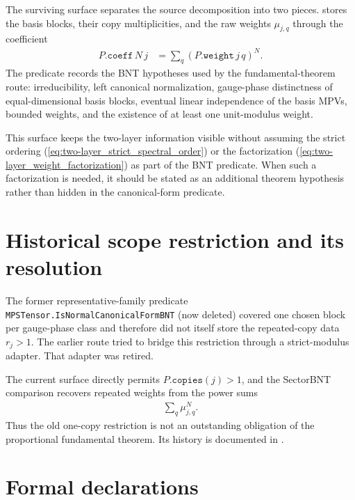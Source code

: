 \documentclass{article}
\begin{document}
The surviving surface separates the source decomposition into two pieces.
 stores the basis blocks, their copy
multiplicities, and the raw weights $\mu_{j,q}$ through the coefficient
\begin{align}
    P.\mathtt{coeff}\,N\,j
        &=\sum_q(P.\mathtt{weight}\,j\,q)^N.
    \label{eq:two-layer_sector_power_sum_coefficient}
\end{align}
The predicate  records the BNT hypotheses used by
the fundamental-theorem route: irreducibility, left canonical normalization,
gauge-phase distinctness of equal-dimensional basis blocks, eventual linear
independence of the basis MPVs, bounded weights, and the existence of at least
one unit-modulus weight.

This surface keeps the two-layer information visible without assuming the
strict ordering (\ref{eq:two-layer_strict_spectral_order}) or the factorization
(\ref{eq:two-layer_weight_factorization}) as part of the BNT predicate. When
such a factorization is needed, it should be stated as an additional theorem
hypothesis rather than hidden in the canonical-form predicate.

\section{Historical scope restriction and its resolution}

The former representative-family predicate \texttt{MPSTensor.IsNormalCanonicalFormBNT}
(now deleted) covered
one chosen block per gauge-phase class and therefore did not itself store the
repeated-copy data $r_j>1$. The earlier route tried to bridge this restriction
through a strict-modulus adapter. That adapter was retired.

The current  surface directly permits
$P.\mathtt{copies}(j)>1$, and the SectorBNT comparison recovers repeated weights
from the power sums
\begin{align}
    \sum_q\mu_{j,q}^N.
    \label{eq:two-layer_repeated_weight_power_sum}
\end{align}
Thus the old one-copy restriction is not an outstanding obligation of the
proportional fundamental theorem. Its history is documented in
.

\section{Formal declarations}
\end{document}
